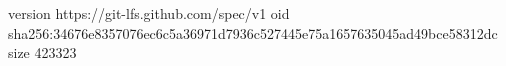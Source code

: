 version https://git-lfs.github.com/spec/v1
oid sha256:34676e8357076ec6c5a36971d7936c527445e75a1657635045ad49bce58312dc
size 423323
